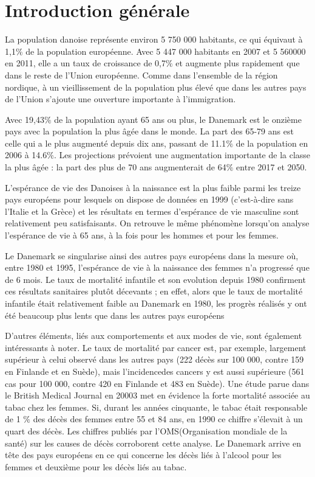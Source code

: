 \chapter*{Introduction générale}
\par La population danoise représente environ 5 750 000 habitants, ce qui équivaut à 1,1$\%$ de la
population européenne. Avec 5 447 000 habitants en 2007 et 5 560000 en 2011, elle a un taux de croissance de 0,7$\%$ et augmente plus rapidement que dans le reste de l’Union européenne. Comme dans l’ensemble de la région nordique, à un vieillissement de la population plus élevé que dans les autres pays de l’Union s’ajoute une ouverture importante à l’immigration.

\par Avec 19,43$\%$ de la population ayant 65 ans ou plus, le Danemark est le onzième pays avec la population la plus âgée dans le monde. La part des 65-79 ans est celle qui a le plus augmenté depuis dix ans, passant de 11.1$\%$ de la population en 2006 à 14.6$\%$. Les projections prévoient une augmentation importante de la classe la plus âgée : la part des plus de 70 ans augmenterait de 64$\%$ entre 2017 et 2050.

\par L’espérance de vie des Danoises à la naissance est la plus faible parmi les treize pays européens pour lesquels on dispose de données en 1999 (c’est-à-dire sans l’Italie et la Grèce) et les résultats en termes d’espérance de vie masculine sont relativement peu satisfaisants. On retrouve le même phénomène lorsqu’on analyse l’espérance de vie à 65 ans, à la fois pour les hommes et pour les femmes.

\par Le Danemark se singularise ainsi des autres pays européens dans la mesure où, entre 1980 et 1995, l’espérance de vie à la naissance des femmes n’a progressé que de 6 mois.
Le taux de mortalité infantile et son evolution depuis 1980 confirment ces résultats sanitaires plutôt décevants ; en
effet, alors que le taux de mortalité infantile était relativement faible au Danemark en
1980, les progrès réalisés y ont été beaucoup plus lents que dans les autres pays européens 

\par D’autres éléments, liés aux comportements et aux modes de vie, sont également intéressants à noter. Le taux de mortalité par cancer est, par exemple, largement supérieur à celui observé dans les autres
pays (222 décès sur 100 000, contre 159 en Finlande et en Suède), mais l’incidencedes cancers y est aussi supérieure (561 cas pour 100 000, contre 420 en Finlande et 483 en Suède). 
Une étude parue dans le British Medical Journal en 20003 met en évidence la forte mortalité associée au tabac chez les femmes. Si, durant les années cinquante, le tabac était responsable de
1 $\%$ des décès des femmes entre 55 et 84 ans, en 1990 ce chiffre s’élevait à un quart des décès.
Les chiffres publiés par l’OMS(Organisation mondiale de la santé) sur les causes de décès corroborent cette analyse.
Le Danemark arrive en tête des pays européens en ce qui concerne les décès liés à l’alcool pour les femmes et deuxième pour les décès liés au tabac.